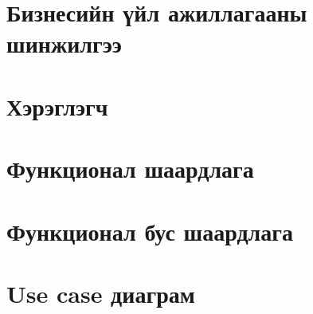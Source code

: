 \section{Бизнесийн үйл ажиллагааны шинжилгээ}
\section{Хэрэглэгч}
\section{Функционал шаардлага}
\section{Функционал бус шаардлага}
\section{Use case диаграм}